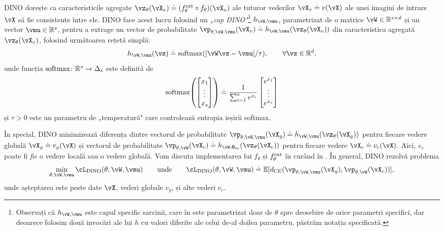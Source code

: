 \documentclass[../../book-main_ro.tex]{subfiles}
\begin{document}
DINO dorește ca caracteristicile agregate \(\vz_{\theta}(\vX_{v}) \doteq (f_{\theta}^{\ext} \circ f_{\theta})(\vX_{v})\) ale tuturor vederilor \(\vX_{v} \doteq v(\vX)\) ale unei imagini de intrare \(\vX\) să fie consistente între ele. DINO face acest lucru folosind un \textit{„cap DINO"}\footnote{Observați că \(h_{\vW, \vmu}\) este capul specific sarcinii, care în  este parametrizat doar de \(\theta\) spre deosebire de orice parametri specifici, dar deoarece folosim două invocări ale lui \(h\) cu valori diferite ale celui de-al doilea parametru, păstrăm notația specificată.} \(h_{\vW, \vmu}\), parametrizat de o matrice \(\vW \in \R^{s \times d}\) și un vector \(\vmu \in \R^{s}\), pentru a extrage un vector de probabilitate \(\vp_{\theta, \vW, \vmu}(\vX_{v}) \doteq h_{\vW, \vmu}(\vz_{\theta}(\vX_{v}))\) din caracteristica agregată \(\vz_{\theta}(\vX_{v})\), folosind următoarea rețetă simplă:
\begin{equation}
    h_{\vW, \vmu}(\vz) \doteq \softmax([\vW\vz - \vmu]/\tau), \qquad \forall \vz \in \R^{d},
\end{equation}
unde funcția \(\operatorname{\mathrm{softmax}} \colon \mathbb{R}^{s} \to \Delta_{s}\) este definită de 
\begin{equation}
    \softmax\rp{\mat{x_{1} \\ \vdots \\ x_{s}}} \doteq \frac{1}{\sum_{i = 1}^{s}e^{x_{i}}}\mat{e^{x_{1}} \\ \vdots \\ e^{x_{s}}}
\end{equation}
și \(\tau > 0\) este un parametru de „temperatură" care controlează entropia ieșirii softmax.

În special, DINO minimizează diferența dintre vectorul de probabilitate \(\vp_{\theta, \vW, \vmu}(\vX_{g}) \doteq h_{\vW, \vmu}(\vz_{\theta}(\vX_{g}))\) pentru fiecare vedere globală \(\vX_{g} \doteq v_{g}(\vX)\) și vectorul de probabilitate \(\vp_{\theta, \vW}(\vX_{c}) \doteq h_{\vW, \vzero_{m}}(\vz_{\theta}(\vX_{c}))\) pentru fiecare vedere \(\vX_{c} \doteq v_{c}(\vX)\). Aici, \(v_{c}\) poate fi \textit{fie} o vedere locală sau o vedere globală. Vom discuta implementarea lui \(f_{\theta}\) și \(f_{\theta}^{\mathrm{ext}}\) în curând în . În general, DINO rezolvă problema
 \begin{equation}\label{eq:dino_loss}
     \min_{\theta, \vW, \vmu}\cL_{\dino}(\theta, \vW, \vmu) \qquad \text{unde} \qquad \cL_{\dino}(\theta, \vW, \vmu) \doteq \Ex[d_{\CE}(\vp_{\theta, \vW, \vmu}(\vX_{g}), \vp_{\theta, \vW}(\vX_{c}))],
\end{equation}
unde așteptarea este peste date \(\vX\), vederi globale \(v_{g}\), și alte vederi \(v_{c}\).
\end{document}
